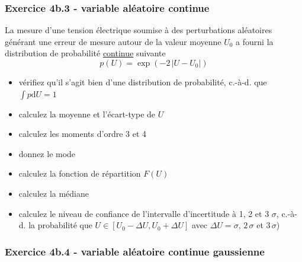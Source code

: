 \documentclass[main.tex]{subfiles}
\begin{document}
\subsubsection*{Exercice 4b.3 - variable aléatoire continue}

La mesure d'une tension électrique soumise à des perturbations aléatoires générant une erreur de mesure autour de la valeur moyenne $U_0$ a fourni la distribution de probabilité \underline{continue} suivante
$$
    p(U)=\exp{(-2\,|U-U_0|)}
$$
\begin{itemize}
    \item vérifiez qu'il s'agit bien d'une distribution de probabilité, c.-à-d. que $\int p\text{d}U=1$
    \item calculez la moyenne et l'écart-type de $U$
    \item calculez les moments d'ordre 3 et 4
    \item donnez le mode
    \item calculez la fonction de répartition $F(U)$
    \item calculez la médiane
    \item calculez le niveau de confiance de l'intervalle d'incertitude à 1, 2 et 3 $\sigma$, c.-à-d. la probabilité que $U\in[U_0-\Delta U,U_0+\Delta U]$ avec $\Delta U=\sigma$, $2\,\sigma$ et $3\,\sigma$)
\end{itemize}

\subsubsection*{Exercice 4b.4 - variable aléatoire continue gaussienne}
\end{document}
